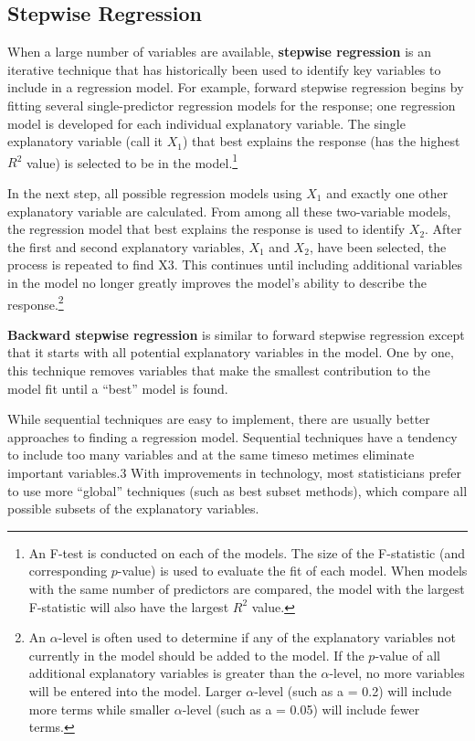 \documentclass[
]{report}
\begin{document}
\subsection{Stepwise Regression}\label{stepwise-regression}

When a large number of variables are available, \textbf{stepwise regression} is an iterative technique that has historically been used to identify key variables to include in a regression model. For example, forward stepwise regression begins by fitting several single-predictor regression models for the response; one regression model is developed for each individual explanatory variable. The single explanatory variable (call it \(X_1\)) that best explains the response (has the highest \(R^2\) value) is selected to be in the model.\footnote{An F-test is conducted on each of the models. The size of the F-statistic (and corresponding \(p\)-value) is used to evaluate the fit of each model. When models with the same number of predictors are compared, the model with the largest F-statistic will also have the largest \(R^2\) value.}

In the next step, all possible regression models using \(X_1\) and exactly one other explanatory variable are calculated. From among all these two-variable models, the regression model that best explains the response is used to identify \(X_2\). After the first and second explanatory variables, \(X_1\) and \(X_2\), have been selected, the process is repeated to find X3. This continues until including additional variables in the model no longer
greatly improves the model's ability to describe the response.\footnote{An \(\alpha\)-level is often used to determine if any of the explanatory variables not currently in the model should be added to the model. If the \(p\)-value of all additional explanatory variables is greater than the \(\alpha\)-level, no more variables will be entered into the model. Larger \(\alpha\)-level (such as a = 0.2) will include more terms while smaller \(\alpha\)-level (such as a = 0.05) will include fewer terms.}

\textbf{Backward stepwise regression} is similar to forward stepwise regression except that it starts with all potential explanatory variables in the model. One by one, this technique removes variables that make the smallest contribution to the model fit until a ``best'' model is found.

While sequential techniques are easy to implement, there are usually better approaches to finding a regression model. Sequential techniques have a tendency to include too many variables and at the same timeso metimes eliminate important variables.3 With improvements in technology, most statisticians prefer to use more ``global'' techniques (such as best subset methods), which compare all possible subsets of the explanatory variables.
\end{document}
